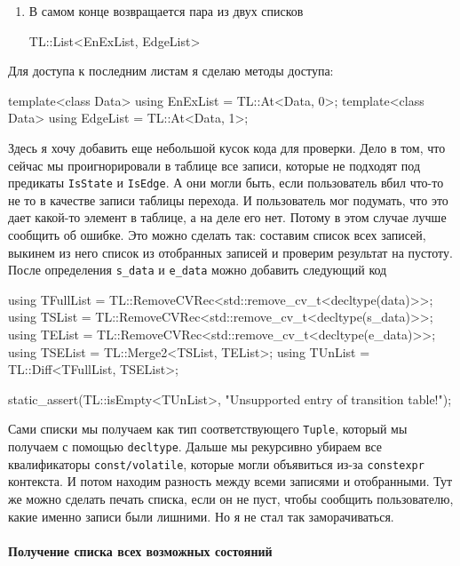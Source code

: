 \documentclass{article}
\begin{document}
{\begin{enumerate}
\item В самом конце возвращается пара из двух списков
\begin{cppcode}
TL::List<EnExList, EdgeList>
\end{cppcode}
\end{enumerate}
Для доступа к последним листам я сделаю методы доступа:
\begin{cppcode}
template<class Data>
using EnExList = TL::At<Data, 0>;
template<class Data>
using EdgeList = TL::At<Data, 1>;
\end{cppcode}

Здесь я хочу добавить еще небольшой кусок кода для проверки.
Дело в том, что сейчас мы проигнорировали в таблице все записи, которые не подходят под предикаты \verb"IsState" и \verb"IsEdge".
А они могли быть, если пользователь вбил что-то не то в качестве записи таблицы перехода.
И пользователь мог подумать, что это дает какой-то элемент в таблице, а на деле его нет.
Потому в этом случае лучше сообщить об ошибке.
Это можно сделать так: составим список всех записей, выкинем из него список из отобранных записей и проверим результат на пустоту.
После определения \verb"s_data" и \verb"e_data" можно добавить следующий код
\begin{cppcode}
  using TFullList = TL::RemoveCVRec<std::remove_cv_t<decltype(data)>>;
  using TSList = TL::RemoveCVRec<std::remove_cv_t<decltype(s_data)>>;
  using TEList = TL::RemoveCVRec<std::remove_cv_t<decltype(e_data)>>;
  using TSEList = TL::Merge2<TSList, TEList>;
  using TUnList = TL::Diff<TFullList, TSEList>;

  static_assert(TL::isEmpty<TUnList>, "Unsupported entry of transition table!");
\end{cppcode}
Сами списки мы получаем как тип соответствующего \verb"Tuple", который мы получаем с помощью \verb"decltype".
Дальше мы рекурсивно убираем все квалификаторы \verb"const/volatile", которые могли объявиться из-за \verb"constexpr" контекста.
И потом находим разность между всеми записями и отобранными.
Тут же можно сделать печать списка, если он не пуст, чтобы сообщить пользователю, какие именно записи были лишними.
Но я не стал так заморачиваться.

\paragraph{Получение списка всех возможных состояний}

}
\end{document}
